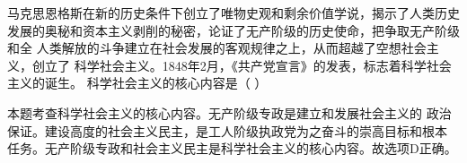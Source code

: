 \question 马克思恩格斯在新的历史条件下创立了唯物史观和剩余价值学说，揭示了人类历史发展的奥秘和资本主义剥削的秘密，论证了无产阶级的历史使命，把争取无产阶级和全
人类解放的斗争建立在社会发展的客观规律之上，从而超越了空想社会主义，创立了
科学社会主义。1848年2月，《共产党宣言》的发表，标志着科学社会主义的诞生。
科学社会主义的核心内容是（ ）
\par{}
\begin{solution}本题考查科学社会主义的核心内容。无产阶级专政是建立和发展社会主义的
政治保证。建设高度的社会主义民主，是工人阶级执政党为之奋斗的崇高目标和根本
任务。无产阶级专政和社会主义民主是科学社会主义的核心内容。故选项D正确。
\end{solution}
